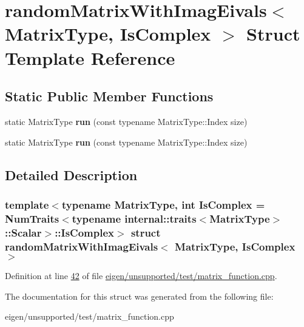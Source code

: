 \hypertarget{structrandom_matrix_with_imag_eivals}{}\section{random\+Matrix\+With\+Imag\+Eivals$<$ Matrix\+Type, Is\+Complex $>$ Struct Template Reference}
\label{structrandom_matrix_with_imag_eivals}
\subsection*{Static Public Member Functions}
\begin{DoxyCompactItemize}
\item 
\mbox{\label{structrandom_matrix_with_imag_eivals_a520fefd780b84fad4b5c89db97732a46}} 
static Matrix\+Type {\bfseries run} (const typename Matrix\+Type\+::\+Index size)
\item 
\mbox{\label{structrandom_matrix_with_imag_eivals_a520fefd780b84fad4b5c89db97732a46}} 
static Matrix\+Type {\bfseries run} (const typename Matrix\+Type\+::\+Index size)
\end{DoxyCompactItemize}


\subsection{Detailed Description}
\subsubsection*{template$<$typename Matrix\+Type, int Is\+Complex = Num\+Traits$<$typename internal\+::traits$<$\+Matrix\+Type$>$\+::\+Scalar$>$\+::\+Is\+Complex$>$\newline
struct random\+Matrix\+With\+Imag\+Eivals$<$ Matrix\+Type, Is\+Complex $>$}



Definition at line \hyperlink{eigen_2unsupported_2test_2matrix__function_8cpp_source_l00042}{42} of file \hyperlink{eigen_2unsupported_2test_2matrix__function_8cpp_source}{eigen/unsupported/test/matrix\+\_\+function.\+cpp}.



The documentation for this struct was generated from the following file\+:\begin{DoxyCompactItemize}
\item 
eigen/unsupported/test/matrix\+\_\+function.\+cpp\end{DoxyCompactItemize}
